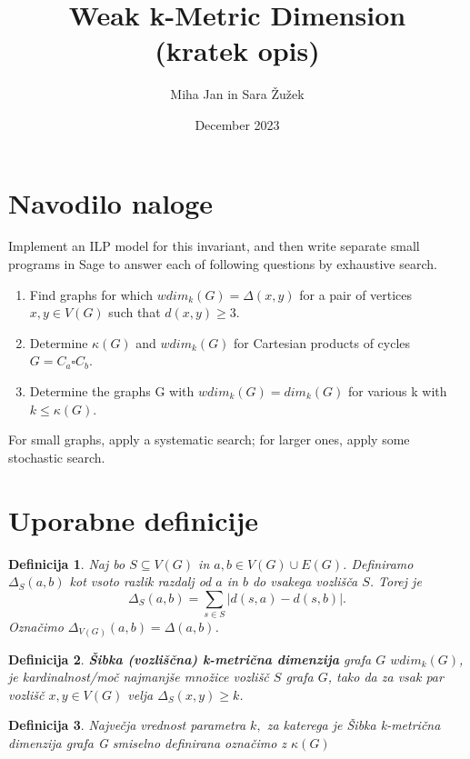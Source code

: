 \documentclass[a4paper,12pt]{article}
\newtheorem{definition}{Definicija}
\begin{document}
\author{Miha Jan in Sara Žužek}
\date{December 2023}
\title{Weak k-Metric Dimension \\ (kratek opis)}
\maketitle

\section{Navodilo naloge}
Implement an ILP model for this invariant, and then write separate
small programs in Sage to answer each of following questions by exhaustive search.
\begin{enumerate}
    \item Find graphs for which $wdim_k(G) = \Delta(x, y)$ for a pair of vertices $x, y \in V(G)$ such that
    $d(x, y) \geq 3$.
    \item Determine $\kappa(G)$ and $wdim_k(G)$ for Cartesian products of cycles $G = C_a \square C_b$.
    \item  Determine the graphs G with $wdim_k(G) = dim_k(G)$ for various k with $k \leq \kappa(G)$.
\end{enumerate}
For small graphs, apply a systematic search; for larger ones, apply some stochastic search.


\section{Uporabne definicije}
    \begin{definition}
       Naj bo $S \subseteq V(G)$ in $a, b \in V(G) \cup E(G)$. Definiramo $\Delta_S (a,b)$ kot vsoto razlik razdalj od $a$ in $b$ do vsakega vozlišča $S$. 
       Torej je $$\Delta_S (a,b) = \sum_{s \in S } |d(s,a) - d(s,b)|.$$
       Označimo $\Delta_{V(G)} (a,b) = \Delta (a,b)$.
    \end{definition}

    

    \begin{definition} 
        {\bf Šibka (vozliščna) k-metrična dimenzija} grafa $G$ $wdim_k(G)$, je kardinalnost/moč
        najmanjše množice vozlišč $S$ grafa $G$, tako da za vsak par vozlišč $x,y \in V(G)$ velja $\Delta_S (x,y) \geq k$.
    \end{definition}

    \begin{definition}
        Največja vrednost parametra $k,$ za katerega je Šibka  k-metrična dimenzija grafa G smiselno definirana označimo z $\kappa(G)$ 
    \end{definition}
\end{document}
